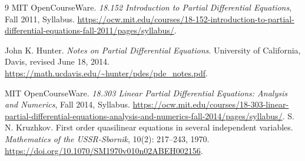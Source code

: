\documentclass[UTF8,12pt,a4paper,fontset=fandol]{ctexbook}
\begin{document}
\backmatter

\begin{thebibliography}{9}
  MIT OpenCourseWare.
  \emph{18.152 Introduction to Partial Differential Equations}, Fall 2011, Syllabus.
  \url{https://ocw.mit.edu/courses/18-152-introduction-to-partial-differential-equations-fall-2011/pages/syllabus/}.

  John K. Hunter.
  \emph{Notes on Partial Differential Equations}.
  University of California, Davis, revised June 18, 2014.
  \url{https://math.ucdavis.edu/~hunter/pdes/pde_notes.pdf}.

  MIT OpenCourseWare.
  \emph{18.303 Linear Partial Differential Equations: Analysis and Numerics}, Fall 2014, Syllabus.
  \url{https://ocw.mit.edu/courses/18-303-linear-partial-differential-equations-analysis-and-numerics-fall-2014/pages/syllabus/}.
  S. N. Kruzhkov.
  First order quasilinear equations in several independent variables.
  \emph{Mathematics of the USSR-Sbornik}, 10(2): 217--243, 1970.
  \url{https://doi.org/10.1070/SM1970v010n02ABEH002156}.
\end{thebibliography}
\end{document}
